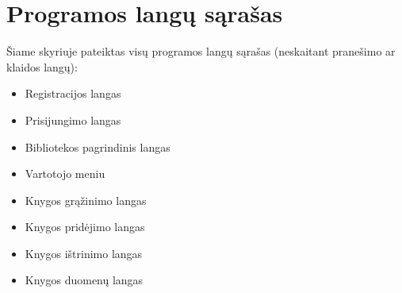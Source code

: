 \documentclass{VUMIFPSkursinis}
\begin{document}

\section{Programos langų sąrašas}
Šiame skyriuje pateiktas visų programos langų sąrašas (neskaitant pranešimo ar klaidos langų):
	\begin{itemize}
    \item Registracijos langas
    \item Prisijungimo langas
    \item Bibliotekos pagrindinis langas
    \item Vartotojo meniu
    \item Knygos grąžinimo langas
    \item Knygos pridėjimo langas
    \item Knygos ištrinimo langas
\item Knygos duomenų langas 
    
    \end{itemize}
\end{document}
